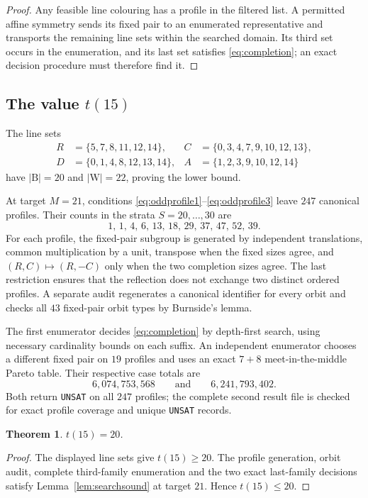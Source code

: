 \documentclass[11pt]{amsart}
\newtheorem{theorem}{Theorem}
\theoremstyle{definition}
\theoremstyle{remark}
\newcommand{\Bl}{\mathrm{B}}
\newcommand{\Wh}{\mathrm{W}}
\begin{document}
\begin{proof}
Any feasible line colouring has a profile in the filtered list.  A permitted
affine symmetry sends its fixed pair to an enumerated representative and
transports the remaining line sets within the searched domain.  Its third
set occurs in the enumeration, and its last set satisfies
\eqref{eq:completion}; an exact decision procedure must therefore find it.
\end{proof}

\subsection{The value \texorpdfstring{$t(15)$}{t(15)}}\label{ssec:t15}

The line sets
\[
\begin{aligned}
R&=\{5,7,8,11,12,14\},&
C&=\{0,3,4,7,9,10,12,13\},\\
D&=\{0,1,4,8,12,13,14\},&
A&=\{1,2,3,9,10,12,14\}
\end{aligned}
\]
have $|\Bl|=20$ and $|\Wh|=22$, proving the lower bound.

At target $M=21$, conditions \eqref{eq:oddprofile1}--\eqref{eq:oddprofile3}
leave $247$ canonical profiles.  Their counts in the strata
$S=20,\ldots,30$ are
\[
1,\,1,\,4,\,6,\,13,\,18,\,29,\,37,\,47,\,52,\,39.
\]
For each profile, the fixed-pair subgroup is generated by independent
translations, common multiplication by a unit, transpose when the fixed
sizes agree, and $(R,C)\mapsto(R,-C)$ only when the two completion sizes
agree.  The last restriction ensures that the reflection does not exchange
two distinct ordered profiles.  A separate audit regenerates a canonical
identifier for every orbit and checks all $43$ fixed-pair orbit types by
Burnside's lemma.

The first enumerator decides \eqref{eq:completion} by depth-first search,
using necessary cardinality bounds on each suffix.  An independent
enumerator chooses a different fixed pair on $19$ profiles and uses an exact
$7+8$ meet-in-the-middle Pareto table.  Their respective case totals are
\[
6{,}074{,}753{,}568\qquad\text{and}\qquad6{,}241{,}793{,}402.
\]
Both return \texttt{UNSAT} on all $247$ profiles; the complete second result
file is checked for exact profile coverage and unique \texttt{UNSAT} records.

\begin{theorem}\label{thm:t15}
$t(15)=20$.
\end{theorem}

\begin{proof}
The displayed line sets give $t(15)\ge20$.  The profile generation,
orbit audit, complete third-family enumeration and the two exact
last-family decisions satisfy Lemma~\ref{lem:searchsound} at target $21$.
Hence $t(15)\le20$.
\end{proof}
\end{document}
